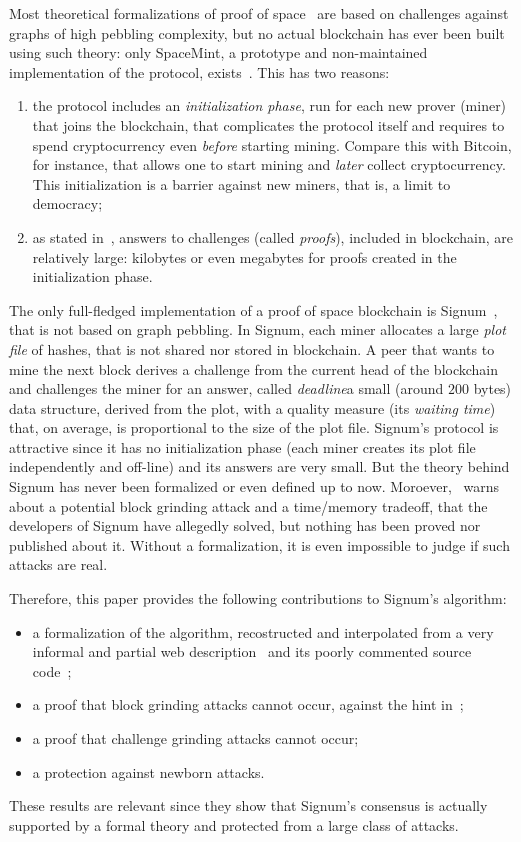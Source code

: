 Most theoretical formalizations of proof of space~\cite{AtenieseBFG14,DziembowskiFKP15,RenD16} are
based on challenges against graphs of high pebbling complexity, but
no actual blockchain has ever been built using such theory: only SpaceMint, a prototype and non-maintained
implementation of the protocol, exists~\cite{ParkKFGAP18}. This has two reasons:
%
\begin{enumerate}
\item the protocol includes an \emph{initialization phase},
  run for each new prover (miner) that joins the blockchain,
  that complicates the protocol itself and
  requires to spend cryptocurrency even \emph{before}
  starting mining. Compare this with Bitcoin, for instance, that allows one to start mining
  and \emph{later} collect cryptocurrency. This initialization is a barrier against new
  miners, that is, a limit to democracy;
\item as stated in~\cite{AbusalahACKPR17}, answers to challenges (called \emph{proofs}),
  included in blockchain, are relatively large:
  kilobytes or even megabytes for proofs created in the initialization phase.
\end{enumerate}
%
The only full-fledged implementation of a proof of space blockchain is Signum~\cite{Signum},
that is not based on graph pebbling.
In Signum, each miner allocates a large \emph{plot file} of hashes, that is not shared nor
stored in blockchain.
A peer that wants to mine the next block derives a challenge from the current head of the blockchain
and challenges the miner for an answer, called
\emph{deadline}\ie a small (around $200$ bytes) data structure, derived from the plot, with a quality measure
(its \emph{waiting time}) that, on average, is proportional to the size of the plot file.
Signum's protocol is attractive since it has no initialization phase (each miner creates its plot file
independently and off-line) and its answers are very small.
But the theory behind Signum has never been formalized
or even defined up to now.
Moroever, \cite{ParkKFGAP18}~warns about a potential block grinding attack and
a time/memory tradeoff, that the developers of Signum have allegedly solved,
but nothing has been proved nor published about it. Without a formalization, it is
even impossible to judge if such attacks are real.

Therefore, this paper provides the following contributions to Signum's algorithm:
%
\begin{itemize}
\item a formalization of the algorithm, recostructed and interpolated from a very informal and partial
  web description~\cite{SignumPlotting} and its poorly commented source code~\cite{SignumSource};
\item a proof that block grinding attacks cannot occur, against the hint in~\cite{ParkKFGAP18};
\item a proof that challenge grinding attacks cannot occur;
\item a protection against newborn attacks.
\end{itemize}
%
These results are relevant since they show that Signum's consensus
is actually supported by a formal theory and
protected from a large class of attacks.

